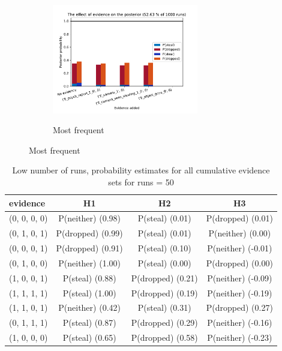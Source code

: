 \documentclass[12pt]{article}
\begin{document}
\begin{figure}[htbp]
\begin{center}
\begin{subfigure}{\textwidth}
{\includegraphics[width=0.7\textwidth]{GroteMarktPrivateEND/plots/freq/evidence_progress_GroteMarktPrivate1000_1000_52.6300.pdf}}
\caption{Most frequent}
\label{sfb}
\end{subfigure}
\end{center}
\end{figure}



\begin{table}
\begin{center}
\begin{tabular}{|l|c|c|c|}
\hline
evidence & H1 & H2 & H3 \\
\hline
(0, 0, 0, 0)&P(neither) (0.98) & P(steal) (0.01) & P(dropped) (0.01) \\
(0, 1, 0, 1)&P(dropped) (0.99) & P(steal) (0.01) & P(neither) (0.00) \\
(0, 0, 0, 1)&P(dropped) (0.91) & P(steal) (0.10) & P(neither) (-0.01) \\
(0, 1, 0, 0)&P(neither) (1.00) & P(steal) (0.00) & P(dropped) (0.00) \\
(1, 0, 0, 1)&P(steal) (0.88) & P(dropped) (0.21) & P(neither) (-0.09) \\
(1, 1, 1, 1)&P(steal) (1.00) & P(dropped) (0.19) & P(neither) (-0.19) \\
(1, 1, 0, 1)&P(neither) (0.42) & P(steal) (0.31) & P(dropped) (0.27) \\
(0, 1, 1, 1)&P(steal) (0.87) & P(dropped) (0.29) & P(neither) (-0.16) \\
(1, 0, 0, 0)&P(steal) (0.65) & P(dropped) (0.58) & P(neither) (-0.23) \\
\hline
\end{tabular}
\end{center}
\caption{ Low number of runs, probability estimates for all cumulative evidence sets for runs =  50}
\label{journal}
\end{table}
\end{document}
